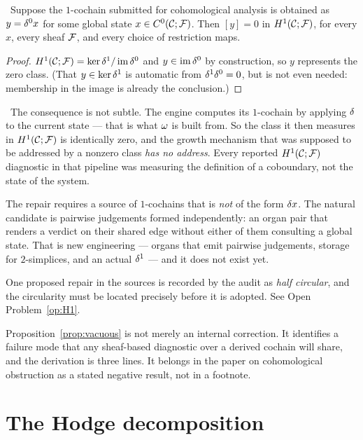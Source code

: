 \begin{proposition}\label{prop:vacuous}
\Proved\ Suppose the $1$-cochain submitted for cohomological analysis is
obtained as $y=\delta^0 x$ for some global state $x\in C^{0}(\mathcal{C};\mathcal{F})$. Then
$[y]=0$ in $H^{1}(\mathcal{C};\mathcal{F})$, for every $x$, every sheaf $\mathcal{F}$, and every choice
of restriction maps.
\end{proposition}
\begin{proof}
$H^{1}(\mathcal{C};\mathcal{F})=\ker\delta^1/\operatorname{im}\delta^0$ and $y\in\operatorname{im}\delta^0$ by construction, so
$y$ represents the zero class. (That $y\in\ker\delta^1$ is automatic from
$\delta^1\delta^0=0$, but is not even needed: membership in the image is
already the conclusion.)
\end{proof}

\begin{hon}\Hon
\Refuted\ The consequence is not subtle. The engine computes its
$1$-cochain by applying $\delta$ to the current state --- that is what
$\omega$ is built from. So the class it then measures in $H^{1}(\mathcal{C};\mathcal{F})$ is
identically zero, and the growth mechanism that was supposed to be
addressed by a nonzero class \emph{has no address}. Every reported
$H^{1}(\mathcal{C};\mathcal{F})$ diagnostic in that pipeline was measuring the definition of a
coboundary, not the state of the system.

The repair requires a source of $1$-cochains that is \emph{not} of the
form $\delta x$. The natural candidate is pairwise judgements formed
independently: an organ pair that renders a verdict on their shared
edge without either of them consulting a global state. That is new
engineering --- organs that emit pairwise judgements, storage for
$2$-simplices, and an actual $\delta^1$ --- and it does not exist yet.

One proposed repair in the sources is recorded by the audit as
\emph{half circular}, and the circularity must be located precisely
before it is adopted. See Open Problem~\ref{op:H1}.
\end{hon}

\begin{remark}
Proposition~\ref{prop:vacuous} is not merely an internal correction. It
identifies a failure mode that any sheaf-based diagnostic over a derived
cochain will share, and the derivation is three lines. It belongs in
the paper on cohomological obstruction as a stated negative result,
not in a footnote.
\end{remark}

\section{The Hodge decomposition}


